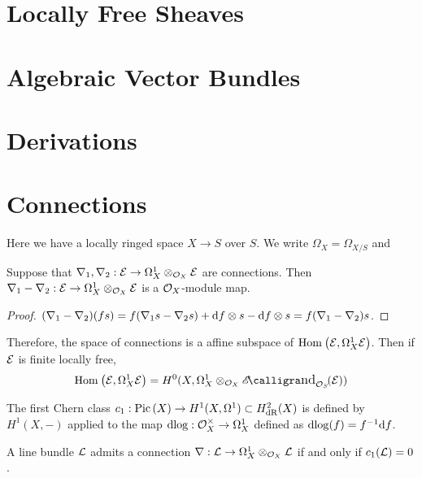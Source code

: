 \documentclass[12pt]{article}
\begin{document}
\section{Locally Free Sheaves}

\section{Algebraic Vector Bundles}

\section{Derivations}

\section{Connections}

\begin{rmk}
Here we have a locally ringed space $X \to S$ over $S$. We write $\Omega_X = \Omega_{X/S}$ and 
\end{rmk}

\begin{lemma}
Suppose that $\nabla_1, \nabla_2 : \mathcal{E} \to \Omega^1_X \otimes_{\mathcal{O}_{X}} \mathcal{E}$ are connections. Then $\nabla_1 - \nabla_2 : \mathcal{E} \to \Omega^1_X \otimes_{\mathcal{O}_{X}} \mathcal{E}$ is a $\mathcal{O}_{X}$-module map.
\end{lemma}

\begin{proof}
$(\nabla_1 - \nabla_2)(fs) = f (\nabla_1 s  - \nabla_2 s) + \mathrm{d}{f} \otimes s - \mathrm{d}{f} \otimes s = f (\nabla_1 - \nabla_2) s$.
\end{proof}

\begin{rmk}
Therefore, the space of connections is a affine subspace of $\mathrm{Hom}_{} \left( \mathcal{E}, \Omega^1_X \mathcal{E} \right)$. Then if $\mathcal{E}$ is finite locally free, 
\[ \Hom{}{\E}{\Omega^1_X \E} = H^0(X, \Omega^1_X \otimes_{\struct{X}} \shEnd{\struct{S}}{\E}) \]
\end{rmk}

\begin{defn}
The first Chern class $c_1 : \mathrm{Pic} \left( X \right) \to H^1(X, \Omega^1) \subset H^2_{\mathrm{dR}}(X)$ is defined by $H^1(X, -)$ applied to the map $\mathrm{d}{\log} : \mathcal{O}_{X}^\times \to \Omega^1_X$ defined as $\mathrm{d}{\log}(f) = f^{-1} \mathrm{d}{f}$.
\end{defn}

\begin{prop}
A line bundle $\mathcal{L}$ admits a connection $\nabla : \mathcal{L} \to \Omega^1_X \otimes_{\mathcal{O}_{X}} \mathcal{L}$ if and only if $c_1(\mathcal{L}) = 0$.
\end{prop}
\end{document}
